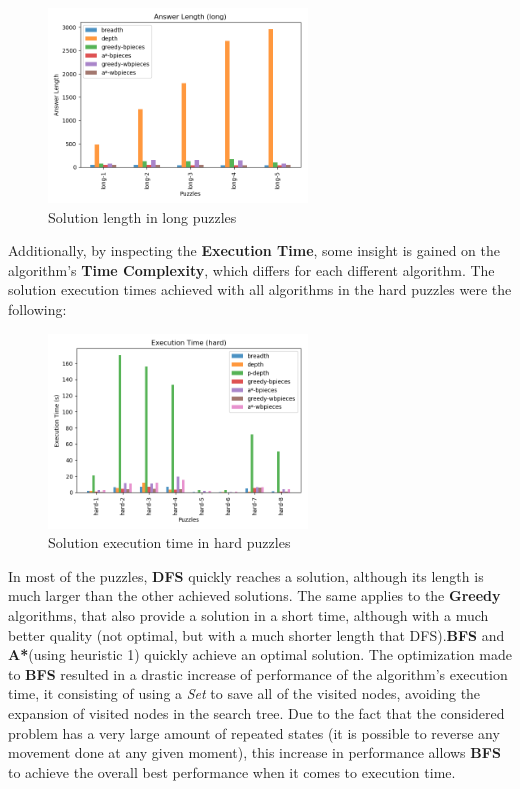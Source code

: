 \documentclass[conference]{IEEEtran}
\begin{document}
\begin{figure}[H]
    \centerline{\includegraphics[width=260px]{../../graphics/answerLength-long.png}}
    \caption{Solution length in long puzzles}
\end{figure}

Additionally, by inspecting the \textbf{Execution Time}, some insight is gained on the algorithm's \textbf{Time Complexity}, which differs for each different algorithm. The solution execution times achieved with all algorithms in the hard puzzles were the following:

\begin{figure}[H]
    \centerline{\includegraphics[width=260px]{../../graphics/executionTime-hard.png}}
    \caption{Solution execution time in hard puzzles}
\end{figure}

In most of the puzzles, \textbf{DFS} quickly reaches a solution, although its length is much larger than the other achieved solutions. The same applies to the \textbf{Greedy} algorithms, that also provide a solution in a short time, although with a much better quality (not optimal, but with a much shorter length that DFS).\textbf{BFS} and \textbf{A*}(using heuristic 1) quickly achieve an optimal solution. The optimization made to \textbf{BFS} resulted in a drastic increase of performance of the algorithm's execution time, it consisting of using a \textit{Set} to save all of the visited nodes, avoiding the expansion of visited nodes in the search tree. Due to the fact that the considered problem has a very large amount of repeated states (it is possible to reverse any movement done at any given moment), this increase in performance allows \textbf{BFS} to achieve the overall best performance when it comes to execution time.
\end{document}
